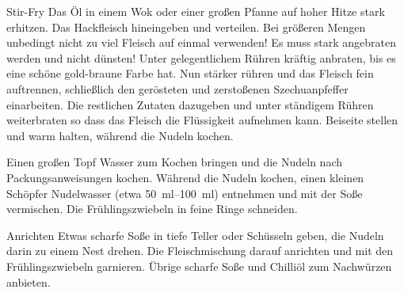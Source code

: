 \begin{recipestep}{Stir-Fry}
Das Öl in einem Wok oder einer großen Pfanne auf hoher Hitze stark erhitzen. Das Hackfleisch hineingeben und verteilen.
Bei größeren Mengen unbedingt nicht zu viel Fleisch auf einmal verwenden! Es muss stark angebraten werden und nicht dünsten!
Unter gelegentlichem Rühren kräftig anbraten, bis es eine schöne gold-braune Farbe hat. Nun stärker rühren und das Fleisch fein
auftrennen, schließlich den gerösteten und zerstoßenen Szechuanpfeffer einarbeiten. Die restlichen Zutaten dazugeben und unter
ständigem Rühren weiterbraten so dass das Fleisch die Flüssigkeit aufnehmen kann. Beiseite stellen und warm halten, während die Nudeln kochen.

Einen großen Topf Wasser zum Kochen bringen und die Nudeln nach Packungsanweisungen kochen. Während die Nudeln kochen, einen kleinen Schöpfer
Nudelwasser (etwa \SIrange{50}{100}{\milli\litre}) entnehmen und mit der Soße vermischen. Die Frühlingszwiebeln in feine Ringe schneiden.
\end{recipestep}

\begin{recipestep}{Anrichten}
Etwas scharfe Soße in tiefe Teller oder Schüsseln geben, die Nudeln darin zu einem Nest drehen.
Die Fleischmischung darauf anrichten und mit den Frühlingszwiebeln garnieren. Übrige scharfe Soße und Chilliöl
zum Nachwürzen anbieten.
\end{recipestep}
